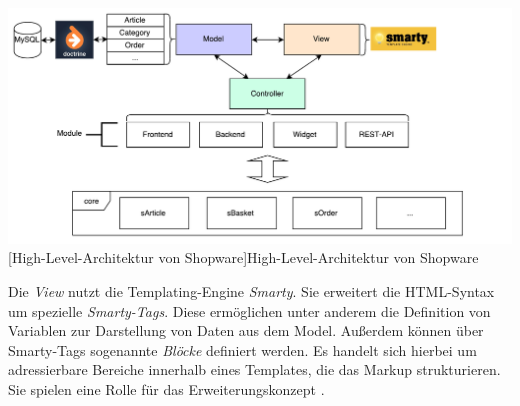 \documentclass[11pt, a4paper, titlepage, listof=totoc, bibliography=totoc, index=totoc, twoside, openright, headings=normal]{scrreprt}
\begin{document}
\vspace{1em}
\begin{minipage}{\linewidth}
	\centering
	\includegraphics[width=1\linewidth]{Abbildungen/shopwareMVCShort.pdf}
	[High-Level-Architektur von Shopware]{High-Level-Architektur von Shopware}
	\label{fig:shopwareMVC}
\end{minipage}
\vspace{0.3em}

Die \emph{View} nutzt die Templating-Engine \emph{Smarty}. Sie erweitert die HTML-Syntax um spezielle \emph{Smarty-Tags}. Diese ermöglichen unter anderem die Definition von Variablen zur Darstellung von Daten aus dem Model. Außerdem können über Smarty-Tags sogenannte \emph{Blöcke} definiert werden. Es handelt sich hierbei um adressierbare Bereiche innerhalb eines Templates, die das Markup strukturieren. Sie spielen eine Rolle für das Erweiterungskonzept \citep{shopware5Docs}.
\end{document}
